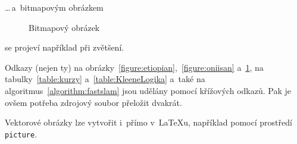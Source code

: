 \documentclass[a4paper, 11pt, a4paper]{article}
\begin{document}
\vspace{1em}

\noindent \dots\,a~bitmapovým obrázkem

\begin{figure}[h]
    \centering
    \caption{Bitmapový obrázek}
    \label{figure:oniisan2}
\end{figure}

\vspace{1em}

\noindent se projeví například při zvětšení.

Odkazy (nejen ty) na obrázky~\ref{figure:etiopian},~\ref{figure:oniisan} a~\ref{figure:oniisan2}, na tabulky~\ref{table:kurzy} a~\ref{table:KleeneLogika} a~také na algoritmus~\ref{algorithm:fastslam} jsou udělány pomocí křížových odkazů. Pak je ovšem potřeba zdrojový soubor přeložit dvakrát.

Vektorové obrázky lze vytvořit i~přímo v~{\LaTeX}u, například pomocí prostředí \texttt{picture}.
\end{document}
